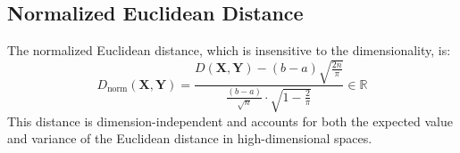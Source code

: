 \documentclass{article}
\begin{document}
\subsection{Normalized Euclidean Distance}
The normalized Euclidean distance, which is insensitive to the dimensionality, is:
\begin{equation}
    D_{\text{norm}}(\mathbf{X}, \mathbf{Y}) = \frac{D(\mathbf{X}, \mathbf{Y}) - (b - a)\sqrt{\frac{2n}{\pi}}}{\frac{(b - a)}{\sqrt{n}} \cdot \sqrt{1 - \frac{2}{\pi}}} \in \mathbb{R}
\end{equation}
This distance is dimension-independent and accounts for both the expected value and variance of the Euclidean distance in high-dimensional spaces.
\end{document}

